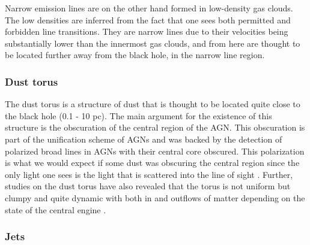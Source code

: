 Narrow emission lines are on the other hand formed in low-density gas clouds. The low densities are inferred from the fact that one sees
both permitted and forbidden line transitions. They are narrow lines due to their velocities being substantially lower than the innermost gas clouds, and from here are thought to be located further away from the black hole, in the narrow line region. 


\subsubsection{Dust torus}

The dust torus is a structure of dust that is thought to be located quite close to the black hole (0.1 - 10 pc). The main argument for the existence of this structure is the obscuration of the central region of the AGN. This obscuration 
is part of the unification scheme of AGNs and was backed by the detection of polarized broad lines in AGNs with their central core obscured. This polarization is what we would expect if some dust was obscuring the central region since the only light one sees is 
the light that is scattered into the line of sight \cite{MASON201597}. Further, studies on the dust torus have also revealed that the torus is not uniform but clumpy and quite dynamic with both in and outflows of matter depending on the state of the central engine \cite{MASON201597}. 





\subsubsection{Jets}
\label{sec:jets}

